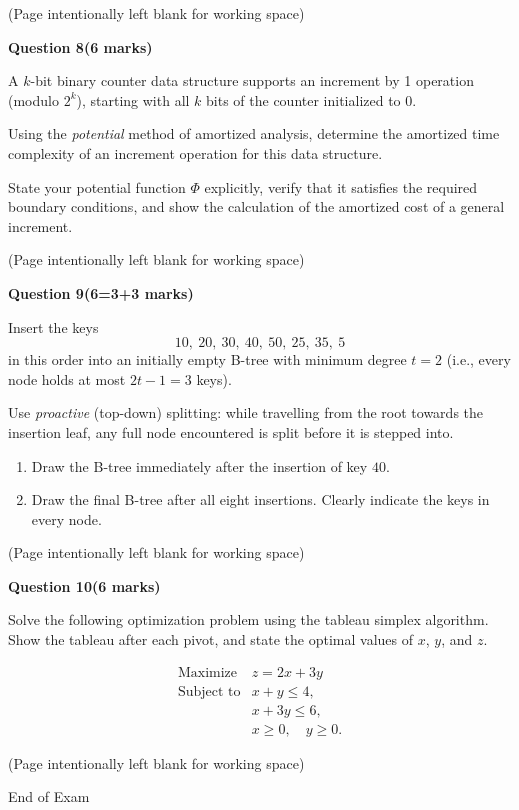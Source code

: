 \documentclass[12pt,letterpaper]{article}
\newcommand{\marksbox}[1]{%
  \vfill
  \begin{flushright}
    \fbox{\parbox[c][1.1cm][c]{1.3cm}{\centering #1}}
  \end{flushright}
}
\newcommand{\questiontitle}[2]{%
  \textbf{Question #1}\hfill\textbf{(#2 marks)}
}
\newcommand{\workingpage}{%
  \newpage
  \begin{center}
    (Page intentionally left blank for working space)
  \end{center}
}
\begin{document}
\marksbox{6}

\workingpage
\newpage

\questiontitle{8}{6}

A $k$-bit binary counter data structure supports an increment by 1 operation
(modulo $2^k$), starting with all $k$ bits of the counter initialized to 0.

Using the \emph{potential} method of amortized analysis, determine the
amortized time complexity of an increment operation for this data structure.

State your potential function $\Phi$ explicitly, verify that it satisfies the
required boundary conditions, and show the calculation of the amortized cost
of a general increment.

\marksbox{6}

\workingpage
\newpage

\questiontitle{9}{6=3+3}

Insert the keys
\[
  10,\ 20,\ 30,\ 40,\ 50,\ 25,\ 35,\ 5
\]
in this order into an initially empty B-tree with minimum degree $t = 2$
(i.e., every node holds at most $2t - 1 = 3$ keys).

Use \emph{proactive} (top-down) splitting: while travelling from the root
towards the insertion leaf, any full node encountered is split before it is
stepped into.

\begin{enumerate}
  \item[(i)] Draw the B-tree immediately after the insertion of key $40$.

  \item[(ii)] Draw the final B-tree after all eight insertions. Clearly
  indicate the keys in every node.
\end{enumerate}

\marksbox{6}

\workingpage
\newpage

\questiontitle{10}{6}

Solve the following optimization problem using the tableau simplex algorithm.
Show the tableau after each pivot, and state the optimal values of $x$, $y$,
and $z$.

\[
\begin{array}{rl}
\text{Maximize} & z = 2x + 3y \\
\text{Subject to} & x + y \leq 4, \\
                  & x + 3y \leq 6, \\
                  & x \geq 0,\quad y \geq 0.
\end{array}
\]

\marksbox{6}

\workingpage

\vfill
\begin{center}
  End of Exam
\end{center}
\end{document}
